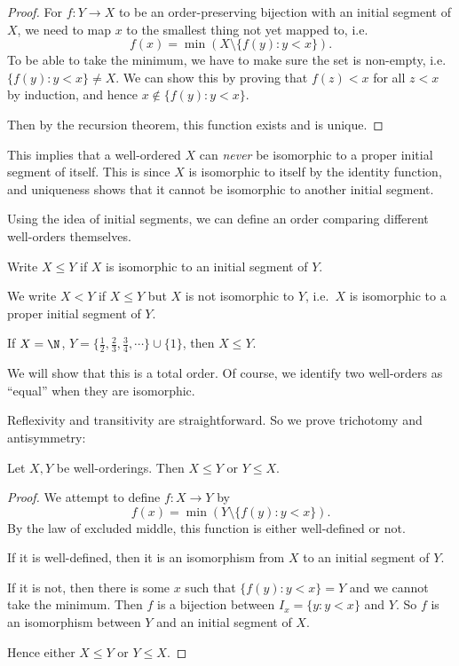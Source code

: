 \documentclass[a4paper]{article}
\begin{document}
\begin{proof}
  For $f: Y\to X$ to be an order-preserving bijection with an initial segment of $X$, we need to map $x$ to the smallest thing not yet mapped to, i.e.
  \[
    f(x) = \min (X\setminus \{f(y): y < x\}).
  \]
  To be able to take the minimum, we have to make sure the set is non-empty, i.e.\ $\{f(y): y < x\} \not= X$. We can show this by proving that $f(z) < x$ for all $z < x$ by induction, and hence $x \not\in \{f(y): y < x\}$.

  Then by the recursion theorem, this function exists and is unique.
\end{proof}
This implies that a well-ordered $X$ can \emph{never} be isomorphic to a proper initial segment of itself. This is since $X$ is isomorphic to itself by the identity function, and uniqueness shows that it cannot be isomorphic to another initial segment.

Using the idea of initial segments, we can define an order comparing different well-orders themselves.
\begin{notation}
  Write $X\leq Y$ if $X$ is isomorphic to an initial segment of $Y$.

  We write $X < Y$ if $X\leq Y$ but $X$ is not isomorphic to $Y$, i.e.\ $X$ is isomorphic to a proper initial segment of $Y$.
\end{notation}

\begin{eg}
  If $X = \N$, $Y = \{\frac{1}{2}, \frac{2}{3}, \frac{3}{4},\cdots\}\cup \{1\}$, then $X \leq Y$.
\end{eg}

We will show that this is a total order. Of course, we identify two well-orders as ``equal'' when they are isomorphic.

Reflexivity and transitivity are straightforward. So we prove trichotomy and antisymmetry:
\begin{thm}
  Let $X, Y$ be well-orderings. Then $X\leq Y$ or $Y \leq X$.
\end{thm}

\begin{proof}
  We attempt to define $f: X\to Y$ by
  \[
    f(x) = \min (Y\setminus \{f(y): y < x\}).
  \]
  By the law of excluded middle, this function is either well-defined or not.

  If it is well-defined, then it is an isomorphism from $X$ to an initial segment of $Y$.

  If it is not, then there is some $x$ such that $\{f(y): y < x\} = Y$ and we cannot take the minimum. Then $f$ is a bijection between $I_x = \{y: y < x\}$ and $Y$. So $f$ is an isomorphism between $Y$ and an initial segment of $X$.

  Hence either $X \leq Y$ or $Y \leq X$.
\end{proof}
\end{document}
